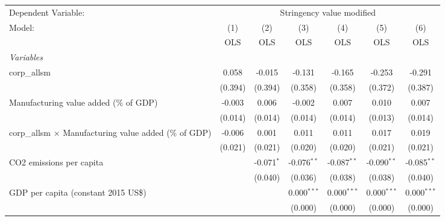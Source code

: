 
\begingroup
\centering
\begin{tabular}{lcccccc}
   \toprule
   Dependent Variable: & \multicolumn{6}{c}{Stringency value modified}\\
   Model:                                                        & (1)     & (2)          & (3)           & (4)           & (5)           & (6)\\  
                                                                 &  OLS    & OLS          & OLS           & OLS           & OLS           & OLS\\  
   \midrule
   \emph{Variables}\\
   corp\_allsm                                                   & 0.058   & -0.015       & -0.131        & -0.165        & -0.253        & -0.291\\   
                                                                 & (0.394) & (0.394)      & (0.358)       & (0.358)       & (0.372)       & (0.387)\\   
   Manufacturing value added (\% of GDP)                         & -0.003  & 0.006        & -0.002        & 0.007         & 0.010         & 0.007\\   
                                                                 & (0.014) & (0.014)      & (0.014)       & (0.014)       & (0.013)       & (0.014)\\   
   corp\_allsm $\times$ Manufacturing value added (\% of GDP)    & -0.006  & 0.001        & 0.011         & 0.011         & 0.017         & 0.019\\   
                                                                 & (0.021) & (0.021)      & (0.020)       & (0.020)       & (0.021)       & (0.021)\\   
   CO2 emissions per capita                                      &         & -0.071$^{*}$ & -0.076$^{**}$ & -0.087$^{**}$ & -0.090$^{**}$ & -0.085$^{**}$\\   
                                                                 &         & (0.040)      & (0.036)       & (0.038)       & (0.038)       & (0.040)\\   
   GDP per capita (constant 2015 US\$)                           &         &              & 0.000$^{***}$ & 0.000$^{***}$ & 0.000$^{***}$ & 0.000$^{***}$\\   
                                                                 &         &              & (0.000)       & (0.000)       & (0.000)       & (0.000)\\   

\end{tabular}
